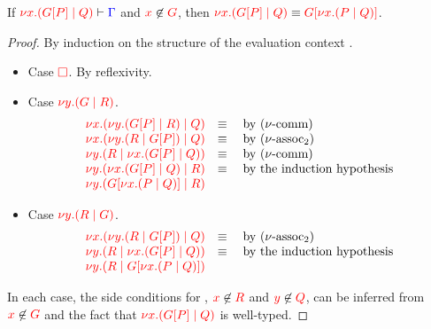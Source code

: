 \begin{lemmaB}\label{thm:cp-display-cut-1}
  If $\seq[{ \tm{\cpCut{x}{\cpPlug{G}{P}}{Q}} }]{ \Gamma }$ and
  $\notFreeIn{x}{G}$, then $\tm{\cpCut{x}{\cpPlug{G}{P}}{Q}} \equiv
  \tm{\cpPlug{G}{\cpCut{x}{P}{Q}}}$. 
\end{lemmaB}
  \begin{proof}
    By induction on the structure of the evaluation context .
    \begin{itemize}
    \item
      Case $\tm{\Box}$. By reflexivity.
    \item
      Case $\tm{\cpCut{y}{G}{R}}$.
      \[\!
        \begin{array}{ll}
          \tm{\cpCut{x}{\cpCut{y}{\cpPlug{G}{P}}{R}}{Q}} & \equiv \quad \text{by \cpEquivCutComm}\\
          \tm{\cpCut{x}{\cpCut{y}{R}{\cpPlug{G}{P}}}{Q}} & \equiv \quad \text{by \cpEquivCutAss2}\\
          \tm{\cpCut{y}{R}{\cpCut{x}{\cpPlug{G}{P}}{Q}}} & \equiv \quad \text{by \cpEquivCutComm}\\
          \tm{\cpCut{y}{\cpCut{x}{\cpPlug{G}{P}}{Q}}{R}} & \equiv \quad \text{by the induction hypothesis}\\ 
          \tm{\cpCut{y}{\cpPlug{G}{\cpCut{x}{P}{Q}}}{R}} &
        \end{array}
      \]
    \item
      Case $\tm{\cpCut{y}{R}{G}}$.
      \[\!
        \begin{array}{ll}
          \tm{\cpCut{x}{\cpCut{y}{R}{\cpPlug{G}{P}}}{Q}} & \equiv \quad \text{by \cpEquivCutAss2}\\
          \tm{\cpCut{y}{R}{\cpCut{x}{\cpPlug{G}{P}}{Q}}} & \equiv \quad \text{by the induction hypothesis}\\
          \tm{\cpCut{y}{R}{\cpPlug{G}{\cpCut{x}{P}{Q}}}}
        \end{array}
      \]
    \end{itemize}
    In each case, the side conditions for , $\notFreeIn{x}{R}$ and
    $\notFreeIn{y}{Q}$, can be inferred from $\notFreeIn{x}{G}$ and the fact that
    $\tm{\cpCut{x}{\cpPlug{G}{P}}{Q}}$ is well-typed.
  \end{proof}
